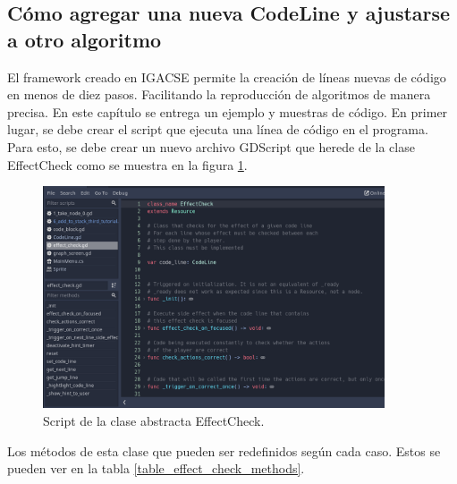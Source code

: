 \subsection{Cómo agregar una nueva CodeLine y ajustarse a otro algoritmo}

El framework creado en IGACSE permite la creación de líneas nuevas de código en menos de diez pasos. Facilitando la reproducción de algoritmos de manera precisa. En este capítulo se entrega un ejemplo y muestras de código. En primer lugar, se debe crear el script que ejecuta una línea de código en el programa. Para esto, se debe crear un nuevo archivo GDScript que herede de la clase EffectCheck como se muestra en la figura \ref{effect_check_script}.

\begin{figure}[h!]
	\centering
	\includegraphics[width=0.9\textwidth]{imagenes/effect_check_script.png}
	\caption{Script de la clase abstracta EffectCheck.}
	\label{effect_check_script}
\end{figure}


Los métodos de esta clase que pueden ser redefinidos según cada caso. Estos se pueden ver en la tabla \ref{table_effect_check_methods}. 


